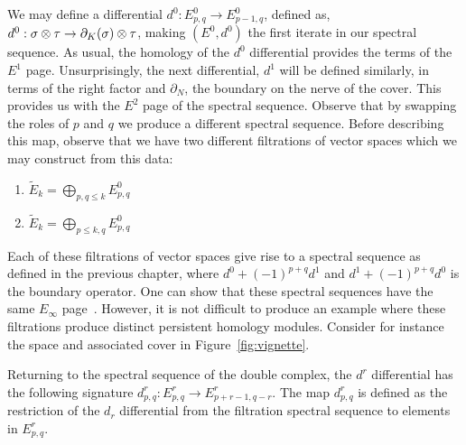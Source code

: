 We may define a differential $d^0: E^0_{p,q} \rightarrow E^0_{p-1,q}$, defined as, $d^0: \sigma \otimes \tau \rightarrow \partial_K(\sigma) \otimes \tau$, making $(E^0, d^0)$ the first iterate in our spectral sequence. As usual, the homology of the $d^0$ differential provides the terms of the $E^1$ page. Unsurprisingly, the next differential, $d^1$ will be defined similarly, in terms of the right factor and $\partial_N$, the boundary on the nerve of the cover. This provides us with the $E^2$ page of the spectral sequence. Observe that by swapping the roles of $p$ and $q$ we produce a different spectral sequence.
Before describing this map, observe that we have two different filtrations of vector spaces which we may construct from this data: 
\begin{enumerate}
\item $\tilde{E}_k = \bigoplus_{p, q \leq k} E^0_{p,q}$
\item $\tilde{E}_k = \bigoplus_{p \leq k, q} E^0_{p,q}$ 
\end{enumerate}
Each of these filtrations of vector spaces give rise to a spectral sequence as defined in the previous chapter, where $d^0 + (-1)^{p+q}d^1$ and $d^1 + (-1)^{p+q}d^0$ is the boundary operator. One can show that these spectral sequences have the same $E_\infty$ page~\cite{mcleary}. However, it is not difficult to produce an example where these filtrations produce distinct persistent homology modules. Consider for instance the space and associated cover in Figure~\ref{fig:vignette}. 

Returning to the spectral sequence of the double complex, the $d^r$ differential has the following signature $d^r_{p,q}: E^r_{p,q} \rightarrow E^r_{p+r-1, q-r}$. The map $d^r_{p,q}$ is defined as the restriction of the $d_r$ differential from the filtration spectral sequence to elements in $E^r_{p,q}$. 

